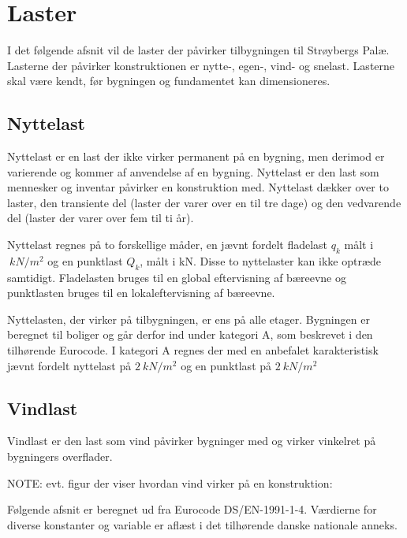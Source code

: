 \chapter{Laster}
I det følgende afsnit vil de laster der påvirker tilbygningen til Strøybergs Palæ. Lasterne der påvirker konstruktionen er nytte-, egen-, vind- og snelast. Lasterne skal være kendt, før bygningen og fundamentet kan dimensioneres.



\section{Nyttelast}
Nyttelast er en last der ikke virker permanent på en bygning, men derimod er varierende og kommer af anvendelse af en bygning. Nyttelast er den last som mennesker og inventar påvirker en konstruktion med. Nyttelast dækker over to laster, den transiente del (laster der varer over en til tre dage) og den vedvarende del (laster der varer over fem til ti år).

Nyttelast regnes på to forskellige måder, en jævnt fordelt fladelast $ q_{k} $ målt i $ \SI{}{kN/m^2} $ og en punktlast $ Q_{k} $, målt i kN. Disse to nyttelaster kan ikke optræde samtidigt. Fladelasten bruges til en global eftervisning af bæreevne og punktlasten bruges til en lokaleftervisning af bæreevne.


Nyttelasten, der virker på tilbygningen, er ens på alle etager. Bygningen er beregnet til boliger og går derfor ind under kategori A, som beskrevet i den tilhørende Eurocode. I kategori A regnes der med en anbefalet karakteristisk jævnt fordelt nyttelast på $\SI{2}{kN/m^2}$ og en punktlast på $\SI{2}{kN/m^2}$



\section{Vindlast}
Vindlast er den last som vind påvirker bygninger med og virker vinkelret på bygningers overflader. 

NOTE: evt. figur der viser hvordan vind virker på en konstruktion:

Følgende afsnit er beregnet ud fra Eurocode DS/EN-1991-1-4. Værdierne for diverse konstanter og variable er aflæst i det tilhørende danske nationale anneks.

